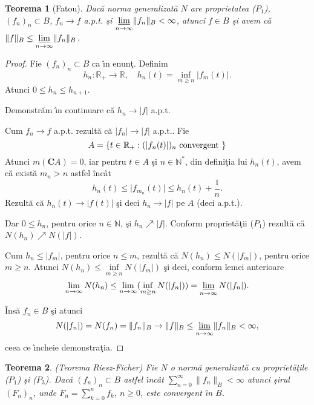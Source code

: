 \documentclass[ a4paper, 12pt]{report}
\newtheorem{theorem}{\bf Teorema}[section]
\theoremstyle{definition}
\theoremstyle{remark}
\numberwithin{equation}{section}
\begin{document}
\begin{theorem}[Fatou]\label{Fatou}
Dac\u a norma generalizat\u a $N$ are proprietatea ($P_1$), $(f_n)_n \subset B$, $f_n \rightarrow f$ a.p.t. \c si $\varliminf\limits_{n \rightarrow \infty}\lVert f_n \rVert_B < \infty$, atunci $f \in B$ \c si avem c\u a $\lVert f\rVert_B \leq \varliminf\limits_{n \rightarrow \infty} \lVert f_n \rVert_B$.
\end{theorem}

\begin{proof} Fie $(f_n)_n \subset B$ ca \^\i n enun\c t. Definim
$$h_n : \mathbb{R}_+ \rightarrow \mathbb{R}, \quad  h_n(t) = \inf\limits_{m \geq n} \lvert f_m(t) \rvert.$$
Atunci $0 \leq h_n \leq h_{n+1}$.

Demonstr\u am  \^\i n continuare c\u a $h_n \rightarrow \lvert f \rvert$ a.p.t.

\smallskip

Cum $f_n \rightarrow f$ a.p.t. rezult\u a c\u a $\lvert f_n \rvert \rightarrow \lvert f \rvert$ a.p.t.. Fie
$$A = \{t \in \mathbb{R}_+ : (\lvert f_n(t) \rvert)_n \hbox{ convergent }\}$$
Atunci $m(\mathbf{C}A) = 0$, iar pentru $t \in A$ \c si $n \in \mathbb{N}^\ast$, din defini\c tia lui $h_n(t)$, avem c\u a exist\u a $m_n > n$ astfel \^inc\^at
$$h_n(t)\leq \lvert f_{m_n}(t) \rvert \leq h_n(t) + \frac{1}{n}.$$
Rezult\u a c\u a $h_n(t) \rightarrow \lvert f(t)\rvert$ \c si deci $h_n \rightarrow \lvert f\rvert$ pe $A$ (deci a.p.t.).

Dar $0 \leq h_n$, pentru orice $n \in \mathbb{N}$, \c si $h_n \nearrow \lvert f\rvert$. Conform propriet\u a\c tii ($P_1$) rezult\u a c\u a $N(h_n) \nearrow N(\lvert f\rvert)$.

Cum $h_n \leq \lvert f_m \rvert$, pentru orice $n \leq m$, rezult\u a c\u a $N(h_n) \leq N(\lvert f_m \rvert)$, pentru orice $m \geq n$. Atunci $N(h_n) \leq \inf\limits_{m \geq n} N(\lvert f_m \rvert)$ \c si deci, conform lemei anterioare
$$\lim\limits_{n \rightarrow \infty} N(h_n) \leq \lim\limits_{n \rightarrow \infty} (\inf\limits_{m \geq n} N(\lvert f_n \rvert)) = \varliminf\limits_{n \rightarrow \infty} N(\lvert f_n \rvert).$$

\^Ins\u a $f_n \in B$ \c si atunci
$$N(\lvert f_n \rvert) = N(f_n) = \lVert f_n \rVert_B \rightarrow \lVert f\rVert_B \leq \varliminf\limits_{n \rightarrow \infty}\lVert f_n\rVert_B < \infty,$$
ceea ce \^\i ncheie demonstra\c tia.
\end{proof}

\begin{theorem} {\rm (Teorema Riesz-Ficher)} Fie $N$ o norm\u  a generalizat\u a cu propriet\u a\c tile ($P_1$) \c si ($P_3$). Dac\u a $(f_n)_n \subset B$ astfel \^\i nc\^ at $\sum\limits_{n = 0}^\infty \lVert f_n \rVert_{B} < \infty$ atunci \c sirul $(F_n)_n$, unde $F_n = \sum \limits_{k = 0}^n f_k$, $n \geq 0$, este convergent \^\i n $B$.
\end{theorem}
\end{document}
